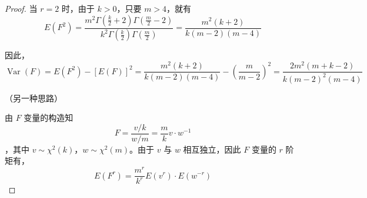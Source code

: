 \documentclass[normal,founder,mtpro2,cn]{elegantnote}
\begin{document}
\begin{enumerate}
\begin{proof}
            当 $r=2$ 时，由于 $k>0$，只要 $m>4$，就有
            \begin{equation*}
                E\left(F^{2}\right)=\frac{m^{2}\Gamma\left(\frac{k}{2}+2\right)\Gamma\left(\frac{m}{2}-2\right)}{k^{2}\Gamma\left(\frac{k}{2}\right)\Gamma\left(\frac{m}{2}\right)}=\frac{m^{2}(k+2)}{k(m-2)(m-4)}
            \end{equation*}

            因此，
            \begin{equation*}
                \operatorname{Var}(F)=E\left(F^{2}\right)-[E(F)]^{2}=\frac{m^{2}(k+2)}{k(m-2)(m-4)}-\left(\frac{m}{m-2}\right)^{2}=\frac{2m^{2}(m+k-2)}{k(m-2)^{2}(m-4)}
            \end{equation*}

            （另一种思路）

            由 $F$ 变量的构造知
            \begin{equation*}
                F=\frac{v/k}{w/m}=\frac{m}{k}v\cdot w^{-1}
            \end{equation*}
            ，其中 $v\sim\chi^{2}(k)$，$w\sim\chi^{2}(m)$。由于 $v$ 与 $w$ 相互独立，因此 $F$ 变量的 $r$ 阶矩有，
            \begin{equation*}
                E\left(F^{r}\right)=\frac{m^{r}}{k^{r}}E\left(v^{r}\right)\cdot E\left(w^{-r}\right)
            \end{equation*}


\end{proof}
\end{enumerate}
\end{document}
